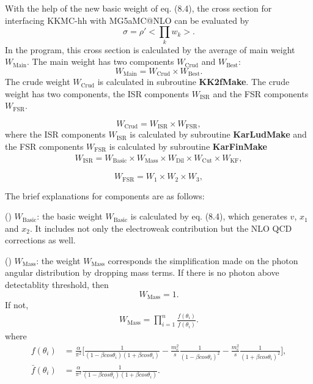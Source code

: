  With the help of the new basic weight of eq. (8.4), the cross section for interfacing KKMC-hh with MG5\textunderscore aMC@NLO can be evaluated by 
 \begin{equation}
 \sigma = \rho'<\prod_{k} w_k>.
 \end{equation}
 In the program, this cross section is calculated by the average of main weight $W_\text{Main}$. The main  weight has two components $W_\text{Crud}$ and $W_\text{Best}$:
 \begin{equation*}
W_\text{Main} = W_\text{Crud} \times W_\text{Best}.
 \end{equation*} 
 The crude weight $W_\text{Crud}$ is calculated in subroutine \textbf{KK2f\textunderscore Make}. The crude weight has two components, the ISR components $W_\text{ISR}$  and the FSR components $W_\text{FSR}$.
 
 \begin{equation*}
W_\text{Crud} =W_\text{ISR}  \times W_\text{FSR} ,
 \end{equation*}
 where the ISR components $W_\text{ISR}$ is calculated by subroutine \textbf{KarLud\textunderscore Make} and the FSR components $W_\text{FSR}$ is calculated by subroutine \textbf{KarFin\textunderscore Make}
 \begin{align*}
W_\text{ISR} = W_\text{Basic} \times W_\text{Mass} \times W_\text{Dil} \times W_\text{Cut} \times  W_\text{KF},
 \end{align*}
 
 \begin{equation}
{W_\text{FSR}} = W_1 \times W_2 \times W_3,
 \end{equation}
 
 The brief explanations for components are as follows:

 () $W_\text{Basic}$: the basic weight $W_\text{Basic}$ is calculated by eq. (8.4), which generates $v$, $x_1$ and $x_2$. It includes not only the electroweak contribution but the NLO QCD corrections as well.

  () $W_\text{Mass}$: the weight $W_\text{Mass}$ corresponds the simplification made on the photon angular distribution by dropping mass terms. If there is no photon above detectablity threshold, then
 \begin{equation*}
 W_\text{Mass} = 1.
 \end{equation*}
 If not, 
 \begin{eqnarray}
W_\text{Mass} = \prod_{i=1}^{n}\frac{f(\theta_i)}{\bar{f}(\theta_i)}.
 \end{eqnarray} 
 where
\begin{align}
f(\theta_i)& = \frac{\alpha}{\pi^2}\biggl[\frac{1}{(1-\beta cos\theta_i)(1+\beta cos\theta_i)}-\frac{m_e^2}{s}\frac{1}{(1-\beta cos\theta_i)^2}-\frac{m_e^2}{s}\frac{1}{(1+\beta cos\theta_i)^2}\biggr],\nonumber\\
\bar{f}(\theta_i) &= \frac{\alpha}{\pi^2}\frac{1}{(1-\beta cos\theta_i)(1+\beta cos\theta_i)}.
\end{align}

